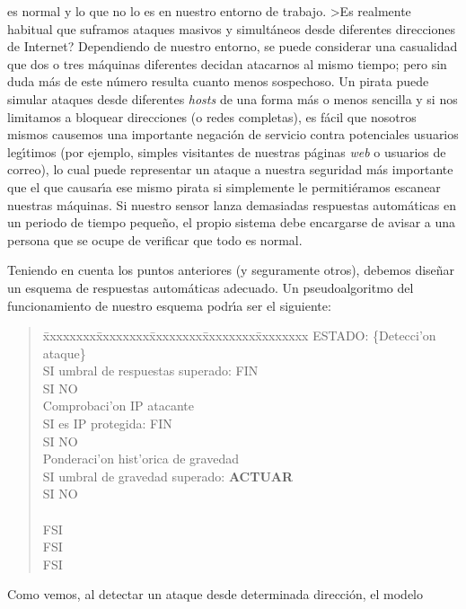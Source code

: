 \begin{itemize}
es normal y lo que no lo es en nuestro entorno de trabajo. >Es realmente 
habitual que suframos ataques masivos y simult\'aneos desde diferentes 
direcciones de Internet? Dependiendo de nuestro entorno, se puede considerar
una casualidad que dos o tres m\'aquinas diferentes decidan atacarnos al mismo
tiempo; pero sin duda m\'as de este n\'umero resulta cuanto menos sospechoso. Un
pirata puede simular ataques desde diferentes {\it hosts} de una forma m\'as o
menos sencilla y si nos limitamos a bloquear direcciones (o redes completas), 
es f\'acil que nosotros mismos causemos una importante negaci\'on de servicio
contra potenciales usuarios leg\'{\i}timos (por ejemplo, simples visitantes de
nuestras p\'aginas {\it web} o usuarios de correo), lo cual puede representar 
un ataque a nuestra seguridad m\'as importante que el que causar\'{\i}a ese
mismo pirata si simplemente le permiti\'eramos escanear nuestras m\'aquinas. Si
nuestro sensor lanza demasiadas respuestas autom\'aticas en un periodo de tiempo
peque\~no, el propio sistema debe encargarse de avisar a una persona que se 
ocupe de verificar que todo es normal.
\end{itemize}
Teniendo en cuenta los puntos anteriores (y seguramente otros), debemos 
dise\~nar un esquema de respuestas autom\'aticas adecuado. Un pseudoalgoritmo 
del funcionamiento de nuestro esquema podr\'{\i}a ser el siguiente:
\begin{quote}
\begin{tabbing}
\=xxxxxxxx\=xxxxxxxx\=xxxxxxxx\=xxxxxxxx\=xxxxxxxx\kill
\>\>\>\>ESTADO: \{Detecci\a'on ataque\}\\
\>SI umbral de respuestas superado: FIN\\
\>SI NO\\
\>\>Comprobaci\a'on IP atacante\\
\>\>SI es IP protegida: FIN\\
\>\>SI NO\\
\>\>\>Ponderaci\a'on hist\a'orica de gravedad\\
\>\>\>SI umbral de gravedad superado: {\bf ACTUAR}\\
\>\>\>SI NO\\
\>\>\>\\
\>\>\>FSI\\
\>\>FSI\\
\>FSI\\
\end{tabbing}
\end{quote}
Como vemos, al detectar un ataque desde determinada direcci\'on, el modelo
